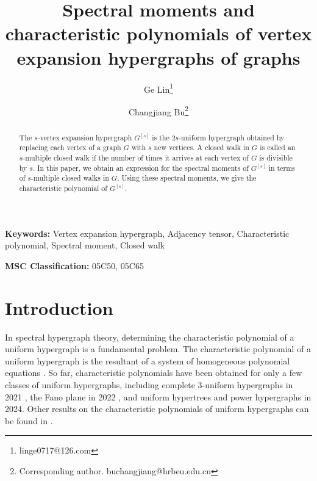 \documentclass{article}
\title{\textbf{Spectral moments and characteristic polynomials of vertex expansion hypergraphs of graphs}}
\author[1]{\quad Ge Lin\thanks{ linge0717@126.com}}
\author[1]{Changjiang Bu\thanks{ Corresponding author. buchangjiang@hrbeu.edu.cn}}
\affil[1]{School of Mathematical Sciences, Harbin Engineering University, Harbin 150001, PR China }
\date{}
\begin{document}
\maketitle

\begin{abstract}

The $s$-vertex expansion hypergraph $G^{[s]}$ is the $2s$-uniform hypergraph obtained by replacing each vertex of a graph $G$ with $s$ new vertices.
A closed walk in $G$ is called an $s$-multiple closed walk if the number of times it arrives at each vertex of $G$ is divisible by $s$.
In this paper,
we obtain an expression for the spectral moments of $G^{[s]}$ in terms of $s$-multiple closed walks in $G$.
Using these spectral moments,
we give the characteristic polynomial of $G^{[s]}$.

\end{abstract}

\noindent\textbf{Keywords:} Vertex expansion hypergraph, Adjacency tensor, Characteristic polynomial, Spectral moment, Closed walk

\noindent\textbf{MSC Classification:} 05C50, 05C65



\section{Introduction}

In spectral hypergraph theory,
determining the characteristic polynomial of a uniform hypergraph is a fundamental problem.
The characteristic polynomial of a uniform hypergraph is the resultant of a system of homogeneous polynomial equations \cite{qi2005eigenvalues}.
So far,
characteristic polynomials have been obtained for only a few classes of uniform hypergraphs,
including complete $3$-uniform hypergraphs in 2021 \cite{zheng2021complete},
the Fano plane in 2022 \cite{clark2022applications},
and uniform hypertrees \cite{li2024hypertree} and power hypergraphs \cite{chen2024spectra} in 2024.
Other results on the characteristic polynomials of uniform hypergraphs can be found in \cite{bao2020combinatorial,chen2021reduction,cooper2015computing,duan2023characteristic,zheng2020simplifying}.
\end{document}
